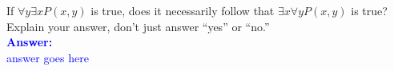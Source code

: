 \item{}
If $\forall y\exists xP(x,y)$ is true, does it necessarily follow that
$\exists x\forall yP(x,y)$ is true? Explain your answer, don't just answer
``yes'' or ``no.''\\[12pt]
\ifanswers
\textcolor{blue}{
\textbf{Answer:}\\[6pt]
answer goes here
}
\newpage
\fi
